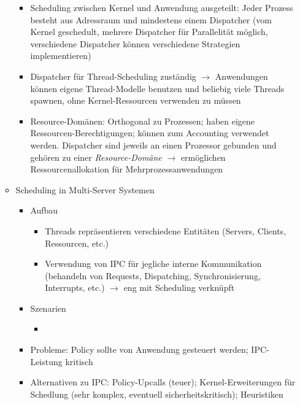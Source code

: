 \begin{itemize}
\begin{itemize}
\begin{itemize}
			\item Scheduling zwischen Kernel und Anwendung ausgeteilt: Jeder Prozess besteht aus Adressraum und mindestens einem Dispatcher (vom Kernel geschedult, mehrere Dispatcher für Parallelität möglich, verschiedene Dispatcher können verschiedene Strategien implementieren)
			\item Dispatcher für Thread-Scheduling zuständig \(\rightarrow\) Anwendungen können eigene Thread-Modelle benutzen und beliebig viele Threads spawnen, ohne Kernel-Ressourcen verwenden zu müssen
			\item Resource-Domänen: Orthogonal zu Prozessen; haben eigene Ressourcen-Berechtigungen; können zum Accounting verwendet werden. Dispatcher sind jeweils an einen Prozessor gebunden und gehören zu einer \textit{Resource-Domäne} \(\rightarrow\) ermöglichen Ressourcenallokation für Mehrprozessanwendungen
		\end{itemize}
		\item Scheduling in Multi-Server Systemen
		\begin{itemize}
			\item Aufbau
			\begin{itemize}
				\item Threads repräsentieren verschiedene Entitäten (Servers, Clients, Ressourcen, etc.)
				\item Verwendung von IPC für jegliche interne Kommunikation (behandeln von Requests, Dispatching, Synchronisierung, Interrupts, etc.) \(\rightarrow\) eng mit Scheduling verknüpft
			\end{itemize}
			\item Szenarien
			\begin{itemize}
				\item %
			\end{itemize}
			\item Probleme: Policy sollte von Anwendung gesteuert werden; IPC-Leistung kritisch
			\item Alternativen zu IPC: Policy-Upcalls (teuer); Kernel-Erweiterungen für Schedlung (sehr komplex, eventuell sicherheitskritisch); Heuristiken
		\end{itemize}
	\end{itemize}
\end{itemize}





















